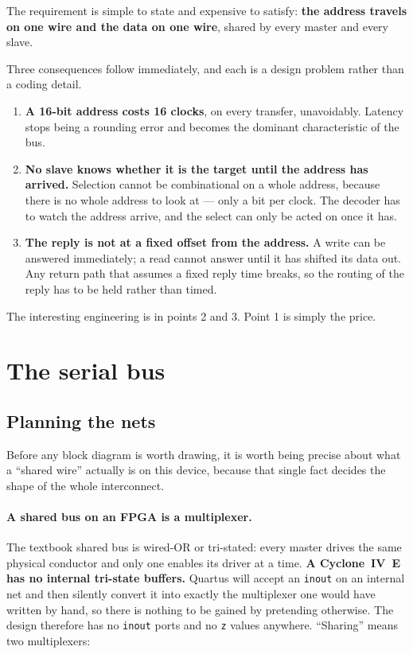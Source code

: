 \documentclass[11pt,a4paper]{article}
\newcommand{\sig}[1]{\texttt{#1}}
\begin{document}
The requirement is simple to state and expensive to satisfy: \textbf{the
address travels on one wire and the data on one wire}, shared by every master
and every slave.

Three consequences follow immediately, and each is a design problem rather
than a coding detail.

\begin{enumerate}[leftmargin=1.6em,itemsep=2pt]
\item \textbf{A 16-bit address costs 16 clocks}, on every transfer,
      unavoidably. Latency stops being a rounding error and becomes the
      dominant characteristic of the bus.

\item \textbf{No slave knows whether it is the target until the address has
      arrived.} Selection cannot be combinational on a whole address, because
      there is no whole address to look at --- only a bit per clock. The
      decoder has to watch the address arrive, and the select can only be
      acted on once it has.

\item \textbf{The reply is not at a fixed offset from the address.}
      A write can be answered immediately; a read cannot answer until it has
      shifted its data out. Any return path that assumes a fixed reply time
      breaks, so the routing of the reply has to be held rather than timed.
\end{enumerate}

The interesting engineering is in points 2 and 3. Point 1 is simply the price.

\section{The serial bus}

\subsection{Planning the nets}
\label{sec:nets}

Before any block diagram is worth drawing, it is worth being precise about
what a ``shared wire'' actually is on this device, because that single fact
decides the shape of the whole interconnect.

\paragraph{A shared bus on an FPGA is a multiplexer.}
The textbook shared bus is wired-OR or tri-stated: every master drives the
same physical conductor and only one enables its driver at a time.
\textbf{A Cyclone~IV~E has no internal tri-state buffers.} Quartus will accept
an \sig{inout} on an internal net and then silently convert it into exactly
the multiplexer one would have written by hand, so there is nothing to be
gained by pretending otherwise. The design therefore has no \sig{inout} ports
and no \sig{z} values anywhere. ``Sharing'' means two multiplexers:
\end{document}
